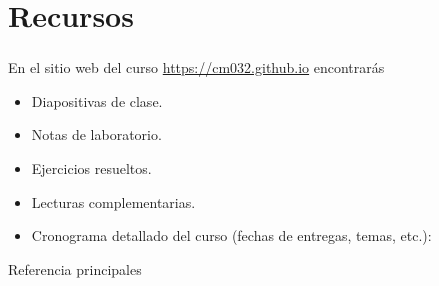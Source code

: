 \section{Recursos}

\begin{frame}
	\frametitle{\insertsection}

	En el sitio web del curso \url{https://cm032.github.io} encontrarás
	\begin{itemize}
		\item Diapositivas de clase.
		\item Notas de laboratorio.
		\item Ejercicios resueltos.
		\item Lecturas complementarias.
		\item Cronograma detallado del curso (fechas de entregas, temas, etc.):
	\end{itemize}

	\begin{block}{Referencia principales}
		\begin{refsection}
			\nocite{Atkinson2009}
			\nocite{Thomas1995}
			\nocite{Salgado2022}
			\nocite{Vázquez2015}
			\nocite{Hesthaven2018}
			\printbibliography[heading=none]
		\end{refsection}
	\end{block}
\end{frame}
